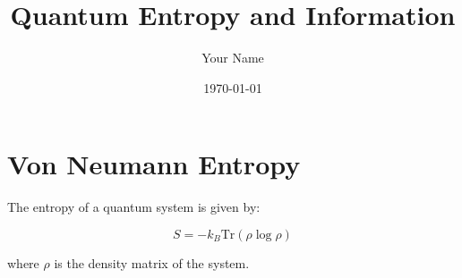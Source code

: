 \documentclass{article}
\begin{document}
    \title{Quantum Entropy and Information}
    \author{Your Name}
    \date{\today}
    \maketitle

    \section{Von Neumann Entropy}
    The entropy of a quantum system is given by:

    \begin{equation}
        S = - k_B \text{Tr}(\rho \log \rho)
    \end{equation}

    where \( \rho \) is the density matrix of the system.

    
\end{document}
